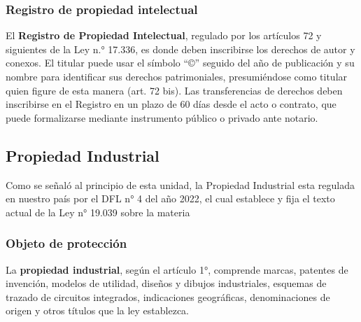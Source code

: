 \documentclass{templateNote}
\begin{document}
\subsubsection{Registro de propiedad intelectual}

El \textbf{Registro de Propiedad Intelectual}, regulado por los artículos 72 y siguientes de la Ley n.° 17.336, es donde deben inscribirse los derechos de autor y conexos. El titular puede usar el símbolo ``\copyright'' seguido del año de publicación y su nombre para identificar sus derechos patrimoniales, presumiéndose como titular quien figure de esta manera (art. 72 bis). Las transferencias de derechos deben inscribirse en el Registro en un plazo de 60 días desde el acto o contrato, que puede formalizarse mediante instrumento público o privado ante notario.


\subsection{Propiedad Industrial}
Como se señaló al principio de esta unidad, la Propiedad Industrial esta regulada en nuestro país por el DFL n° 4 del año 2022, el cual establece y fija el texto actual de la Ley n° 19.039 sobre la materia

\subsubsection{Objeto de protección}
La \textbf{propiedad industrial}, según el artículo 1°, comprende marcas, patentes de invención, modelos de utilidad, diseños y dibujos industriales, esquemas de trazado de circuitos integrados, indicaciones geográficas, denominaciones de origen y otros títulos que la ley establezca.
\end{document}
